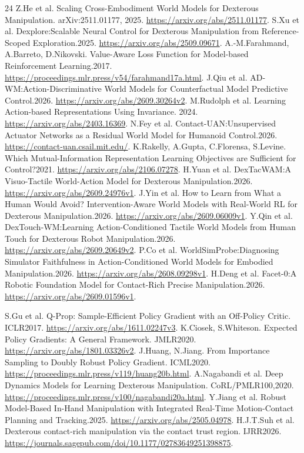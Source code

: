 \documentclass[10pt]{article}
\begin{document}
\begin{thebibliography}{24}
 Z.He et al. Scaling Cross-Embodiment World Models for Dexterous Manipulation.
arXiv:2511.01177, 2025. \url{https://arxiv.org/abs/2511.01177}.
 S.Xu et al. Dexplore:Scalable Neural Control for Dexterous Manipulation
from Reference-Scoped Exploration.2025. \url{https://arxiv.org/abs/2509.09671}.
 A.-M.Farahmand, A.Barreto, D.Nikovski. Value-Aware Loss Function
for Model-based Reinforcement Learning.2017. \url{https://proceedings.mlr.press/v54/farahmand17a.html}.
 J.Qiu et al. AD-WM:Action-Discriminative World Models for Counterfactual
Model Predictive Control.2026. \url{https://arxiv.org/abs/2609.30264v2}.
 M.Rudolph et al. Learning Action-based Representations Using Invariance.
2024. \url{https://arxiv.org/abs/2403.16369}.
 N.Fey et al. Contact-UAN:Unsupervised Actuator Networks as a Residual
World Model for Humanoid Control.2026. \url{https://contact-uan.csail.mit.edu/}.
 K.Rakelly, A.Gupta, C.Florensa, S.Levine. Which Mutual-Information
Representation Learning Objectives are Sufficient for Control?2021.
\url{https://arxiv.org/abs/2106.07278}.
 H.Yuan et al. DexTacWAM:A Visuo-Tactile World-Action Model for
Dexterous Manipulation.2026. \url{https://arxiv.org/abs/2609.24976v1}.
 J.Yin et al. How to Learn from What a Human Would Avoid?
Intervention-Aware World Models with Real-World RL for Dexterous Manipulation.2026.
\url{https://arxiv.org/abs/2609.06009v1}.
 Y.Qin et al. DexTouch-WM:Learning Action-Conditioned Tactile World
Models from Human Touch for Dexterous Robot Manipulation.2026.
\url{https://arxiv.org/abs/2609.20649v2}.
 P.Co et al. WorldSimProbe:Diagnosing Simulator Faithfulness in
Action-Conditioned World Models for Embodied Manipulation.2026.
\url{https://arxiv.org/abs/2608.09298v1}.
 H.Deng et al. Facet-0:A Robotic Foundation Model for Contact-Rich
Precise Manipulation.2026. \url{https://arxiv.org/abs/2609.01596v1}.

 S.Gu et al. Q-Prop: Sample-Efficient Policy Gradient with an Off-Policy Critic. ICLR2017. \url{https://arxiv.org/abs/1611.02247v3}.
 K.Ciosek, S.Whiteson. Expected Policy Gradients: A General Framework. JMLR2020. \url{https://arxiv.org/abs/1801.03326v2}.
 J.Huang, N.Jiang. From Importance Sampling to Doubly Robust Policy Gradient. ICML2020. \url{https://proceedings.mlr.press/v119/huang20b.html}.
 A.Nagabandi et al. Deep Dynamics Models for Learning Dexterous Manipulation. CoRL/PMLR100,2020. \url{https://proceedings.mlr.press/v100/nagabandi20a.html}.
 Y.Jiang et al. Robust Model-Based In-Hand Manipulation with Integrated Real-Time Motion-Contact Planning and Tracking.2025. \url{https://arxiv.org/abs/2505.04978}.
 H.J.T.Suh et al. Dexterous contact-rich manipulation via the contact trust region. IJRR2026. \url{https://journals.sagepub.com/doi/10.1177/02783649251398875}.


\end{thebibliography}
\end{document}
